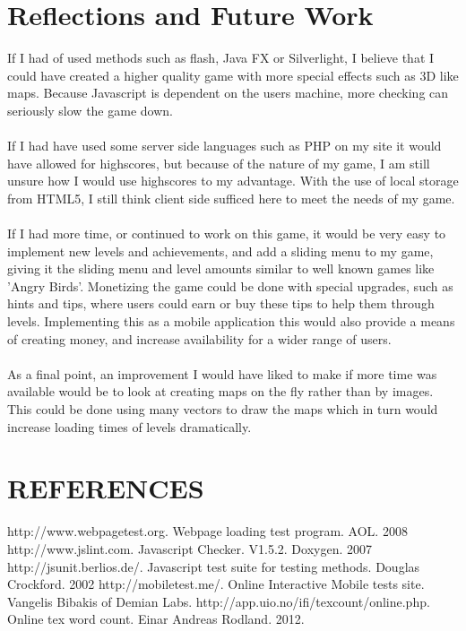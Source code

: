 \documentclass[a4paper]{article}
\begin{document}
\section{Reflections and Future Work}
If I had of used methods such as flash, Java FX or Silverlight, I believe that I
could have created a higher quality game with more special effects such as 3D
like maps. Because Javascript is dependent on the users machine, more checking
can seriously slow the game down.\\
\\If I had have used some server side languages such as PHP on my site it would
have allowed for highscores, but because of the nature of my game, I am still
unsure how I would use highscores to my advantage. With the use of local storage
from HTML5, I still think client side sufficed here to meet the needs of my
game.\\
\\If I had more time, or continued to work on this game, it would be very easy
to implement new levels and achievements, and add a sliding menu to my game,
giving it the sliding menu and level amounts similar to well known games like
'Angry Birds'.  Monetizing the game could be done with special upgrades, such as
hints and tips, where users could earn or buy these tips to help them through
levels. Implementing this as a mobile application this would also provide a
means of creating money, and increase availability for a wider range of users.\\
\\As a final point, an improvement I would have liked to make if more time was
available would be to look at creating maps on the fly rather than by images.
This could be done using many vectors to draw the maps which in turn would
increase loading times of levels dramatically. 

\vspace{10mm} 
\begin{center}
\end{center}

\section{REFERENCES}

\begin{thebibliography}{9}

 http://www.webpagetest.org. Webpage loading test program.
AOL. 2008
 http://www.jslint.com. Javascript Checker. V1.5.2. Doxygen.
2007
 http://jsunit.berlios.de/. Javascript test suite for testing
methods. Douglas Crockford. 2002
 http://mobiletest.me/. Online Interactive Mobile tests site.
Vangelis Bibakis of Demian Labs.
 http://app.uio.no/ifi/texcount/online.php. Online tex word
count. Einar Andreas Rodland. 2012.
\end{thebibliography}
\end{document}
